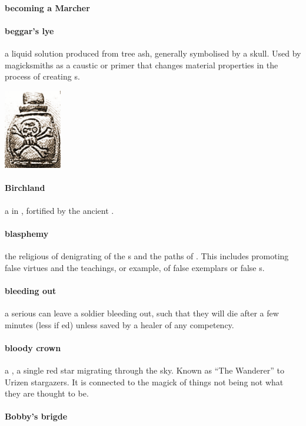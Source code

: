 \paragraph{becoming a Marcher} 
\paragraph{beggar's lye} a liquid solution produced from tree ash, generally symbolised by a skull. Used by magicksmiths as a caustic or primer that changes material properties in the process of creating s.\begin{center}\includegraphics[width=2.52cm]{encyclopedia/BeggarsLye} \end{center}
\paragraph{Birchland} a  in , fortified by the ancient .
\paragraph{blasphemy} the religious  of denigrating of the s and the paths of . This includes promoting false virtues and the teachings, or example, of false exemplars or false s.
\paragraph{bleeding out} a serious  can leave a soldier bleeding out, such that they will die after a few minutes (less if ed) unless saved by a healer of any competency.
\paragraph{bloody crown} a , a single red star migrating through the sky. Known as “The Wanderer” to Urizen stargazers. It is connected to the magick of things not being not what they are thought to be.
\paragraph{Bobby's brigde} 
